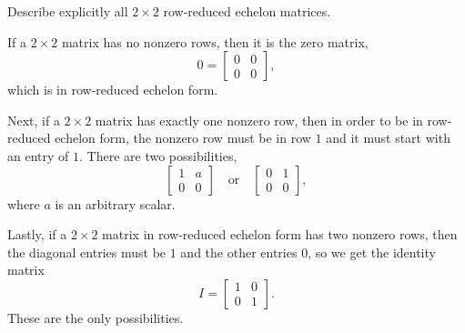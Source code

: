  Describe explicitly all $2\times2$ row-reduced echelon
matrices.
\begin{solution}
  If a $2\times2$ matrix has no nonzero rows, then it is the zero matrix,
  \begin{equation*}
    0 =
    \begin{bmatrix}
      0 & 0 \\
      0 & 0
    \end{bmatrix},
  \end{equation*}
  which is in row-reduced echelon form.

  Next, if a $2\times2$ matrix has exactly one nonzero row, then in
  order to be in row-reduced echelon form, the nonzero row must be in
  row $1$ and it must start with an entry of $1$. There are two
  possibilities,
  \begin{equation*}
    \begin{bmatrix}
      1 & a \\
      0 & 0
    \end{bmatrix}
    \quad\text{or}\quad
    \begin{bmatrix}
      0 & 1 \\
      0 & 0
    \end{bmatrix},
  \end{equation*}
  where $a$ is an arbitrary scalar.

  Lastly, if a $2\times2$ matrix in row-reduced echelon form has two
  nonzero rows, then the diagonal entries must be $1$ and the other
  entries $0$, so we get the identity matrix
  \begin{equation*}
    I =
    \begin{bmatrix}
      1 & 0 \\
      0 & 1
    \end{bmatrix}.
  \end{equation*}
  These are the only possibilities.
\end{solution}
